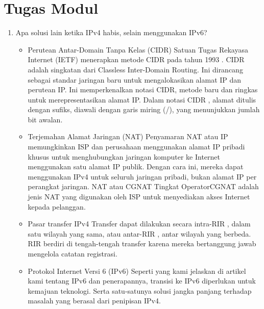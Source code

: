 \section*{Tugas Modul} %
\begin{enumerate}

    \item Apa solusi lain ketika IPv4 habis, selain menggunakan IPv6?
        \begin{itemize}
            \item Perutean Antar-Domain Tanpa Kelas (CIDR)
            Satuan Tugas Rekayasa Internet (IETF) menerapkan metode CIDR pada tahun 1993 . CIDR adalah singkatan dari Classless Inter-Domain Routing. Ini dirancang sebagai standar jaringan baru untuk mengalokasikan alamat IP dan perutean IP. Ini memperkenalkan notasi CIDR, metode baru dan ringkas untuk merepresentasikan alamat IP. Dalam notasi CIDR , alamat ditulis dengan sufiks, diawali dengan garis miring (/), yang menunjukkan jumlah bit awalan. 
            \item Terjemahan Alamat Jaringan (NAT)
            Penyamaran NAT atau IP memungkinkan ISP dan perusahaan menggunakan alamat IP pribadi khusus untuk menghubungkan jaringan komputer ke Internet menggunakan satu alamat IP publik. Dengan cara ini, mereka dapat menggunakan IPv4 untuk seluruh jaringan pribadi, bukan alamat IP per perangkat jaringan. NAT atau CGNAT Tingkat OperatorCGNAT adalah jenis NAT yang digunakan oleh ISP untuk menyediakan akses Internet kepada pelanggan. 
            \item Pasar transfer IPv4
            Transfer dapat dilakukan secara intra-RIR , dalam satu wilayah yang sama, atau antar-RIR , antar wilayah yang berbeda. RIR berdiri di tengah-tengah transfer karena mereka bertanggung jawab mengelola catatan registrasi.
            \item Protokol Internet Versi 6 (IPv6)
            Seperti yang kami jelaskan di artikel kami tentang IPv6 dan penerapannya, transisi ke IPv6 diperlukan untuk kemajuan teknologi. Serta satu-satunya solusi jangka panjang terhadap masalah yang berasal dari penipisan IPv4.
        \end{itemize}


\end{enumerate}
